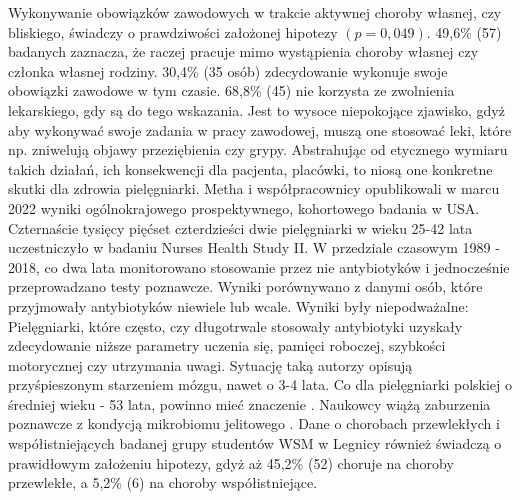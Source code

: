 \documentclass[a4paper,12pt,twoside,openright]{mwrep}
\begin{document}
Wykonywanie obowiązków zawodowych w trakcie aktywnej choroby własnej, czy bliskiego, świadczy o prawdziwości założonej hipotezy $( p=0,049)$. 49,6\% (57) badanych zaznacza, że raczej pracuje mimo wystąpienia choroby własnej czy członka własnej rodziny. 30,4\% (35 osób) zdecydowanie wykonuje swoje obowiązki zawodowe w tym czasie. 68,8\% (45) nie korzysta ze zwolnienia lekarskiego, gdy są do tego wskazania. Jest to wysoce niepokojące zjawisko, gdyż aby wykonywać swoje zadania w pracy zawodowej, muszą one stosować leki, które np. zniwelują objawy przeziębienia czy grypy. Abstrahując od etycznego wymiaru takich działań,  ich konsekwencji dla pacjenta, placówki, to niosą one konkretne skutki dla zdrowia pielęgniarki. Metha i współpracownicy opublikowali w marcu 2022 wyniki ogólnokrajowego prospektywnego, kohortowego badania  w USA. Czternaście tysięcy pięćset czterdzieści dwie  pielęgniarki w wieku 25-42 lata uczestniczyło w badaniu Nurses Health Study II. W przedziale czasowym 1989 - 2018,  co dwa lata monitorowano stosowanie przez nie antybiotyków i jednocześnie przeprowadzano testy poznawcze. Wyniki porównywano z danymi osób, które przyjmowały antybiotyków niewiele lub wcale. Wyniki były niepodważalne: Pielęgniarki, które często, czy długotrwale stosowały antybiotyki uzyskały zdecydowanie niższe parametry uczenia się, pamięci roboczej, szybkości motorycznej czy utrzymania uwagi. Sytuację taką autorzy opisują przyśpieszonym starzeniem mózgu, nawet o 3-4 lata.  Co dla  pielęgniarki polskiej o średniej wieku - 53 lata, powinno mieć znaczenie \cite{statystyka}.  Naukowcy  wiążą zaburzenia poznawcze z  kondycją mikrobiomu jelitowego \cite{metha}.
Dane o chorobach przewlekłych i współistniejących badanej grupy  studentów WSM w Legnicy  również  świadczą o prawidłowym założeniu hipotezy, gdyż aż 45,2\% (52) choruje na choroby przewlekłe, a 5,2\% (6) na choroby współistniejące.
\end{document}
